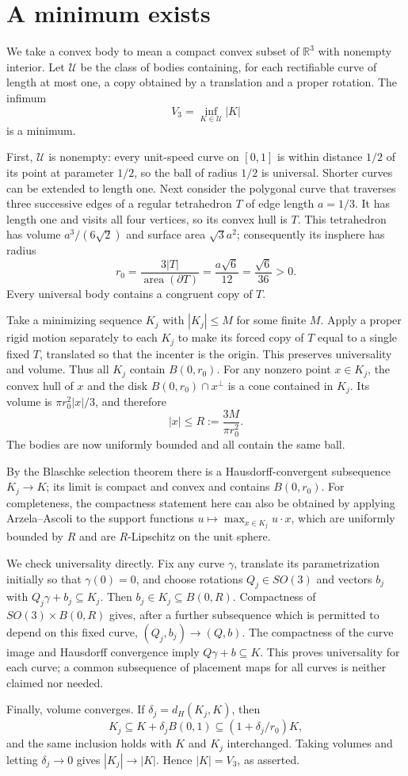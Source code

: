 \section{A minimum exists}\label{sec:existence}
We take a convex body to mean a compact convex subset of $\mathbb R^3$
with nonempty interior. Let $\mathcal U$ be the class of bodies containing,
for each rectifiable curve of length at most one, a copy obtained by a
translation and a proper rotation. The infimum
\[
 V_3 = \inf_{K\in\mathcal U}|K|
\]
is a minimum.

First, $\mathcal U$ is nonempty: every unit-speed curve on $[0,1]$ is
within distance $1/2$ of its point at parameter $1/2$, so the ball of radius
$1/2$ is universal. Shorter curves can be extended to length one.
Next consider the polygonal curve that traverses three successive edges
of a regular tetrahedron $T$ of edge length $a=1/3$. It has length one
and visits all four vertices, so its convex hull is $T$. This tetrahedron
has volume $a^3/(6\sqrt2)$ and surface area $\sqrt3a^2$; consequently
its insphere has radius
\[
 r_0=\frac{3|T|}{\operatorname{area}(\partial T)}
 =\frac{a\sqrt6}{12}=\frac{\sqrt6}{36}>0.
\]
Every universal body contains a congruent copy of $T$.

Take a minimizing sequence $K_j$ with $|K_j|\le M$ for some finite $M$.
Apply a proper rigid motion separately to each $K_j$ to make its forced
copy of $T$ equal to a single fixed $T$, translated so that the incenter
is the origin. This preserves universality and volume. Thus all $K_j$
contain $B(0,r_0)$. For any nonzero point $x\in K_j$, the convex hull of $x$ and
the disk $B(0,r_0)\cap x^\perp$ is a cone contained in $K_j$. Its volume is
$\pi r_0^2|x|/3$, and therefore
\[
 |x|\le R:=\frac{3M}{\pi r_0^2}.
\]
The bodies are now uniformly bounded and all contain the same ball.

By the Blaschke selection theorem there is a Hausdorff-convergent
subsequence $K_j\to K$; its limit is compact and convex and contains
$B(0,r_0)$. For completeness, the compactness statement here can also be
obtained by applying Arzela--Ascoli to the support functions
$u\mapsto\max_{x\in K_j}u\cdot x$, which are uniformly bounded by $R$ and
are $R$-Lipschitz on the unit sphere.

We check universality directly. Fix any curve $\gamma$, translate its
parametrization initially so that $\gamma(0)=0$, and choose rotations
$Q_j\in SO(3)$ and vectors $b_j$ with
$Q_j\gamma+b_j\subseteq K_j$. Then $b_j\in K_j\subseteq B(0,R)$.
Compactness of $SO(3)\times B(0,R)$ gives, after a further subsequence
which is permitted to depend on this fixed curve,
$(Q_j,b_j)\to(Q,b)$. The compactness of the curve image and Hausdorff
convergence imply $Q\gamma+b\subseteq K$. This proves universality for
each curve; a common subsequence of placement maps for all curves is
neither claimed nor needed.

Finally, volume converges. If $\delta_j=d_H(K_j,K)$, then
\[
 K_j\subseteq K+\delta_j B(0,1)
 \subseteq(1+\delta_j/r_0)K,
\]
and the same inclusion holds with $K$ and $K_j$ interchanged. Taking
volumes and letting $\delta_j\to0$ gives $|K_j|\to|K|$. Hence
$|K|=V_3$, as asserted.

